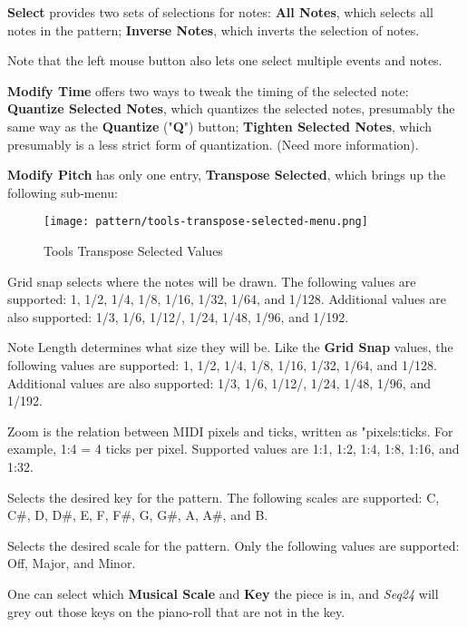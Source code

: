    \textbf{Select} provides two sets of selections for notes:
   \textbf{All Notes}, which selects all notes in the pattern;
   \textbf{Inverse Notes}, which inverts the selection of notes.

   Note that the left mouse button also lets one select multiple events and
   notes.

   \textbf{Modify Time} offers two ways to tweak the timing of the selected
   note:
   \textbf{Quantize Selected Notes}, which quantizes the selected notes,
   presumably the same way as the \textbf{Quantize} ("\textbf{Q}") button;
   \textbf{Tighten Selected Notes}, which presumably is a less strict form
   of quantization.  (Need more information).

   \textbf{Modify Pitch} has only one entry, \textbf{Transpose Selected},
   which brings up the following sub-menu:

\begin{figure}[H]
   \centering 
   \texttt{[image: pattern/tools-transpose-selected-menu.png]}
   \caption{Tools Transpose Selected Values}
   \label{fig:pattern_editor_tools_transpose_selected_menu}
\end{figure}

   Grid snap selects where the notes will be drawn.
   The following values are supported:
   1, 1/2, 1/4, 1/8, 1/16, 1/32, 1/64, and 1/128.
   Additional values are also supported:
   1/3, 1/6, 1/12/, 1/24, 1/48, 1/96, and 1/192.

   Note Length determines what size they will be.
   Like the \textbf{Grid Snap} values,
   the following values are supported:
   1, 1/2, 1/4, 1/8, 1/16, 1/32, 1/64, and 1/128.
   Additional values are also supported:
   1/3, 1/6, 1/12/, 1/24, 1/48, 1/96, and 1/192.

   Zoom is the relation between MIDI pixels and ticks, written as
   "pixels:ticks.
   For example, 1:4 = 4 ticks per pixel.
   Supported values are 1:1, 1:2, 1:4, 1:8, 1:16, and 1:32.

   Selects the desired key for the pattern.  The following scales are
   supported:  C, C\#, D, D\#, E, F, F\#, G, G\#, A, A\#, and B.

   Selects the desired scale for the pattern.
   Only the following values are supported: Off, Major, and Minor.

   One can select which \textbf{Musical Scale} and
   \textbf{Key} the piece is in,
   and \textsl{Seq24} will grey out those keys on the piano-roll that
   are not in the key.

